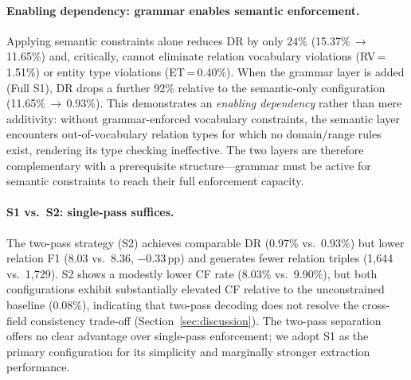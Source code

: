 \paragraph{Enabling dependency: grammar enables semantic enforcement.}
Applying semantic constraints alone reduces DR by only 24\%
(15.37\%\,$\to$\,11.65\%) and, critically, cannot eliminate
relation vocabulary violations (RV\,=\,1.51\%) or entity type
violations (ET\,=\,0.40\%).
When the grammar layer is added (Full S1), DR drops a further 92\%
relative to the semantic-only configuration
(11.65\%\,$\to$\,0.93\%).
This demonstrates an \emph{enabling dependency} rather than mere
additivity: without grammar-enforced vocabulary constraints, the
semantic layer encounters out-of-vocabulary relation types for which
no domain/range rules exist, rendering its type checking ineffective.
The two layers are therefore complementary with a prerequisite
structure---grammar must be active for semantic constraints to reach
their full enforcement capacity.

\paragraph{S1 vs.\ S2: single-pass suffices.}
The two-pass strategy (S2) achieves comparable DR
(0.97\% vs.\ 0.93\%) but lower relation F1
(8.03 vs.\ 8.36, $-$0.33\,pp) and generates fewer relation triples
(1{,}644 vs.\ 1{,}729).
S2 shows a modestly lower CF rate (8.03\% vs.\ 9.90\%), but both
configurations exhibit substantially elevated CF relative to the
unconstrained baseline (0.08\%), indicating that two-pass decoding
does not resolve the cross-field consistency trade-off
(Section~\ref{sec:discussion}).
The two-pass separation offers no clear advantage over single-pass
enforcement; we adopt S1 as the primary configuration for its
simplicity and marginally stronger extraction performance.
